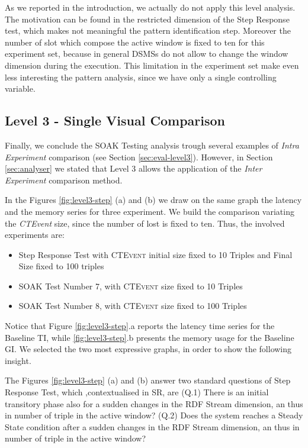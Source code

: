 As we reported in the introduction, we actually do not apply this level analysis. The motivation can be found in the restricted dimension of the Step Response test, which makes not meaningful the pattern identification step. Moreover the number of slot which compose the active window is fixed to ten for this experiment set, because in general DSMSs do not allow to change the window dimension during the execution. This limitation in the experiment set make even less interesting the pattern analysis, since we have only a single controlling variable.

\subsection{Level 3 - Single Visual Comparison}\label{sec:level3-step-inter}

Finally, we conclude the SOAK Testing analysis trough several examples of \textit{Intra Experiment} comparison (see Section \ref{sec:eval-level3}). However, in Section \ref{sec:analyser} we stated that Level 3 allows the application of the  \textit{Inter Experiment} comparison method.

In the Figures \ref{fig:level3-step} (a) and (b) we draw on the same graph the latency and the memory series for three experiment.  We build the comparison variating the \textit{CTEvent} size, since the number of lost is fixed to ten. Thus, the involved experiments are:
\begin{itemize}
\item Step Response Test with \textsc{CTEvent} initial size fixed to 10 Triples and Final Size fixed to 100 triples
\item SOAK Test Number 7, with \textsc{CTEvent} size fixed to 10 Triples
\item SOAK Test Number 8, with \textsc{CTEvent} size fixed to 100 Triples
\end{itemize}

Notice that Figure \ref{fig:level3-step}.a reports the latency time series for the Baseline TI, while \ref{fig:level3-step}.b presents the memory usage for the Baseline GI. We selected the two most expressive graphs, in order to show the following insight.

The Figures \ref{fig:level3-step} (a) and (b) answer two standard questions of Step Response Test, which ,contextualised in SR, are (Q.1) There is an initial transitory phase also for a sudden changes in the RDF Stream dimension, an thus in number of triple in the active window? (Q.2) Does the system reaches a Steady State condition after a sudden changes in the RDF Stream dimension, an thus in number of triple in the active window?


